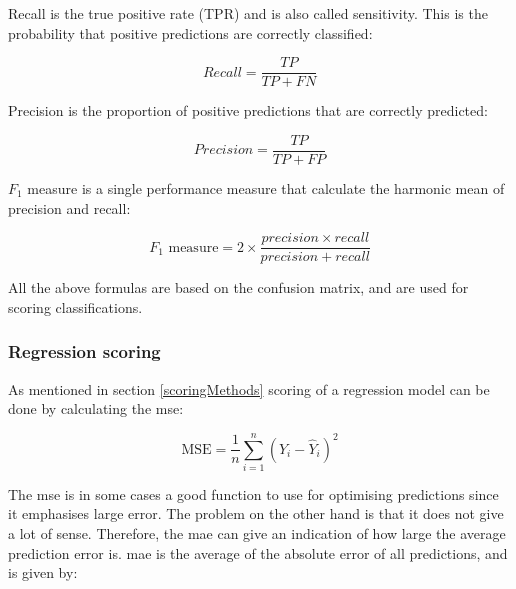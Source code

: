 \documentclass[english, a4paper]{report}
\begin{document}
{{{{                Recall is the true positive rate (TPR) and is also called sensitivity. This is the probability that positive predictions are correctly classified:
                
                \begin{equation}
                    Recall = \frac{TP}{TP+FN}
                \end{equation}
                    
                Precision is the proportion of positive predictions that are correctly predicted: 
                
                \begin{equation}
                    Precision = \frac{TP}{TP+FP}
                \end{equation}
                    
                $F_1$ measure is a single performance measure that calculate the harmonic mean of precision and recall:
                
                \begin{equation}
                    \text{$F_1$ measure} = 2\times \frac{precision \times recall}{precision+recall}
                \end{equation}
                
                All the above formulas are based on the confusion matrix, and are used for scoring classifications.
            }
                
            \subsubsection{Regression scoring}
            {
                As mentioned in section \ref{scoringMethods} scoring of a regression model can be done by calculating the \gls{mse}:
                
                \begin{equation}\label{mse-eq}
                    \text{MSE} = \frac{1}{n} \sum_{i=1}^{n} (Y_{i}-\hat{Y}_{i})^{2} 
                \end{equation}
                
                The \gls{mse} is in some cases a good function to use for optimising predictions since it emphasises large error. The problem on the other hand is that it does not give a lot of sense. Therefore, the \gls{mae} can give an indication of how large the average prediction error is. \Gls{mae} is the average of the absolute error of all predictions, and is given by:
                
}}}}
\end{document}
